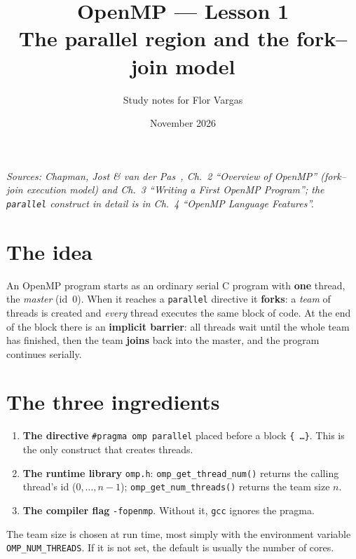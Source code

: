 \documentclass[11pt,a4paper]{article}
\title{\textbf{OpenMP --- Lesson 1}\\[4pt]\large The parallel region and the fork--join model}
\author{Study notes for Flor Vargas}
\date{November 2026}
\begin{document}
\maketitle

\noindent\textit{\small Sources: Chapman, Jost \& van der Pas~\cite{chapman}, Ch.~2
``Overview of OpenMP'' (fork--join execution model) and Ch.~3 ``Writing a First OpenMP
Program''; the \texttt{parallel} construct in detail is in Ch.~4 ``OpenMP Language Features''.}

\section{The idea}
An OpenMP program starts as an ordinary serial C program with \textbf{one} thread, the
\emph{master} (id~0). When it reaches a \texttt{parallel} directive it \textbf{forks}: a
\emph{team} of threads is created and \emph{every} thread executes the same block of code.
At the end of the block there is an \textbf{implicit barrier}: all threads wait until the
whole team has finished, then the team \textbf{joins} back into the master, and the program
continues serially.

\begin{center}
\end{center}

\section{The three ingredients}
\begin{enumerate}
  \item \textbf{The directive} \texttt{\#pragma omp parallel} placed before a block
        \texttt{\{ \ldots \}}. This is the only construct that creates threads.
  \item \textbf{The runtime library} \texttt{omp.h}:
        \texttt{omp\_get\_thread\_num()} returns the calling thread's id
        ($0,\dots,n-1$); \texttt{omp\_get\_num\_threads()} returns the team size $n$.
  \item \textbf{The compiler flag} \texttt{-fopenmp}. Without it, \texttt{gcc} ignores the
        pragma.
\end{enumerate}
The team size is chosen at run time, most simply with the environment variable
\texttt{OMP\_NUM\_THREADS}. If it is not set, the default is usually the number of cores.
\end{document}
